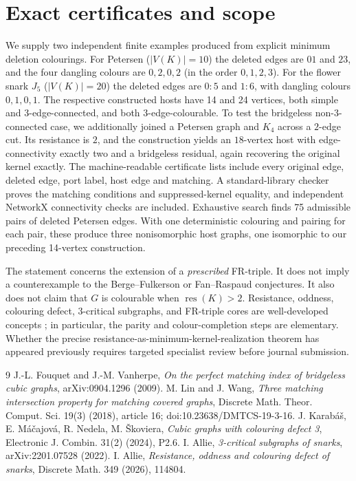 \documentclass[11pt]{article}
\newcommand{\rc}{\operatorname{res}}
\begin{document}
\section{Exact certificates and scope}
We supply two independent finite examples produced from explicit minimum deletion colourings. For Petersen ($|V(K)|=10$) the deleted edges are $01$ and $23$, and the four dangling colours are $0,2,0,2$ (in the order $0,1,2,3$). For the flower snark $J_5$ ($|V(K)|=20$) the deleted edges are $0\!:\!5$ and $1\!:\!6$, with dangling colours $0,1,0,1$. The respective constructed hosts have 14 and 24 vertices, both simple and $3$-edge-connected, and both $3$-edge-colourable. To test the bridgeless non-$3$-connected case, we additionally joined a Petersen graph and $K_4$ across a $2$-edge cut. Its resistance is $2$, and the construction yields an $18$-vertex host with edge-connectivity exactly two and a bridgeless residual, again recovering the original kernel exactly. The machine-readable certificate lists include every original edge, deleted edge, port label, host edge and matching. A standard-library checker proves the matching conditions and suppressed-kernel equality, and independent NetworkX connectivity checks are included. Exhaustive search finds 75 admissible pairs of deleted Petersen edges. With one deterministic colouring and pairing for each pair, these produce three nonisomorphic host graphs, one isomorphic to our preceding 14-vertex construction.

The statement concerns the extension of a \emph{prescribed} FR-triple. It does not imply a counterexample to the Berge--Fulkerson or Fan--Raspaud conjectures. It also does not claim that $G$ is colourable when $\rc(K)>2$. Resistance, oddness, colouring defect, $3$-critical subgraphs, and FR-triple cores are well-developed concepts \cite{Allie26,Karabas24,Allie22,FV09}; in particular, the parity and colour-completion steps are elementary. Whether the precise resistance-as-minimum-kernel-realization theorem has appeared previously requires targeted specialist review before journal submission.

\begin{thebibliography}{9}\small
{} J.-L. Fouquet and J.-M. Vanherpe, \emph{On the perfect matching index of bridgeless cubic graphs}, arXiv:0904.1296 (2009).
 M. Lin and J. Wang, \emph{Three matching intersection property for matching covered graphs}, Discrete Math. Theor. Comput. Sci. 19(3) (2018), article 16; doi:10.23638/DMTCS-19-3-16.
 J. Karab\'a\v{s}, E. M\'a\v{c}ajov\'a, R. Nedela, M. \v{S}koviera, \emph{Cubic graphs with colouring defect 3}, Electronic J. Combin. 31(2) (2024), P2.6.
 I. Allie, \emph{3-critical subgraphs of snarks}, arXiv:2201.07528 (2022).
 I. Allie, \emph{Resistance, oddness and colouring defect of snarks}, Discrete Math. 349 (2026), 114804.
\end{thebibliography}
\end{document}
